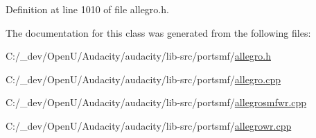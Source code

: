 Definition at line 1010 of file allegro.\+h.



The documentation for this class was generated from the following files\+:\begin{DoxyCompactItemize}
\item 
C\+:/\+\_\+dev/\+Open\+U/\+Audacity/audacity/lib-\/src/portsmf/\hyperlink{allegro_8h}{allegro.\+h}\item 
C\+:/\+\_\+dev/\+Open\+U/\+Audacity/audacity/lib-\/src/portsmf/\hyperlink{allegro_8cpp}{allegro.\+cpp}\item 
C\+:/\+\_\+dev/\+Open\+U/\+Audacity/audacity/lib-\/src/portsmf/\hyperlink{allegrosmfwr_8cpp}{allegrosmfwr.\+cpp}\item 
C\+:/\+\_\+dev/\+Open\+U/\+Audacity/audacity/lib-\/src/portsmf/\hyperlink{allegrowr_8cpp}{allegrowr.\+cpp}\end{DoxyCompactItemize}

